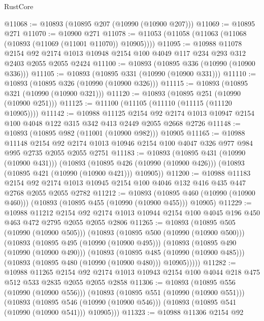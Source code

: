 \begin{lexlean}{RustCore}
\begin{coremodule}
@11068 := @10893 (@10895 @207 (@10990 (@10900 @207)))
@11069 := @10895 @271
@11070 := @10900 @271
@11078 := @11053 (@11058 (@11063 (@11068 (@10893 (@11069 (@11001 @11070)) @10905))))
@11095 := @10988
    @11078
    @2154
    @92
    @2174
    @1013
    @10948
    @2154
    @100
    @4049
    @117
    @234
    @293
    @312
    @2403
    @2055
    @2055
    @2424
@11100 := @10893 (@10895 @336 (@10990 (@10900 @336)))
@11105 := @10893 (@10895 @331 (@10990 (@10900 @331)))
@11110 := @10893 (@10895 @326 (@10990 (@10900 @326)))
@11115 := @10893 (@10895 @321 (@10990 (@10900 @321)))
@11120 := @10893 (@10895 @251 (@10990 (@10900 @251)))
@11125 := @11100 (@11105 (@11110 (@11115 (@11120 @10905))))
@11142 := @10988
    @11125
    @2154
    @92
    @2174
    @1013
    @10947
    @2154
    @100
    @4048
    @122
    @315
    @342
    @413
    @2449
    @2055
    @2668
    @2726
@11148 := @10893 (@10895 @982 (@11001 (@10900 @982))) @10905
@11165 := @10988
    @11148
    @2154
    @92
    @2174
    @1013
    @10946
    @2154
    @100
    @4047
    @326
    @977
    @984
    @995
    @2735
    @2055
    @2055
    @2751
@11183 := @10893
    (@10895 @431 (@10990 (@10900 @431)))
    (@10893
      (@10895 @426 (@10990 (@10900 @426)))
      (@10893 (@10895 @421 (@10990 (@10900 @421))) @10905))
@11200 := @10988
    @11183
    @2154
    @92
    @2174
    @1013
    @10945
    @2154
    @100
    @4046
    @132
    @416
    @435
    @447
    @2768
    @2055
    @2055
    @2782
@11212 := @10893
    (@10895 @460 (@10990 (@10900 @460)))
    (@10893 (@10895 @455 (@10990 (@10900 @455))) @10905)
@11229 := @10988
    @11212
    @2154
    @92
    @2174
    @1013
    @10944
    @2154
    @100
    @4045
    @196
    @450
    @463
    @472
    @2795
    @2055
    @2055
    @2806
@11265 := @10893
    (@10895 @505 (@10990 (@10900 @505)))
    (@10893
      (@10895 @500 (@10990 (@10900 @500)))
      (@10893
        (@10895 @495 (@10990 (@10900 @495)))
        (@10893
          (@10895 @490 (@10990 (@10900 @490)))
          (@10893
            (@10895 @485 (@10990 (@10900 @485)))
            (@10893 (@10895 @480 (@10990 (@10900 @480))) @10905)))))
@11282 := @10988
    @11265
    @2154
    @92
    @2174
    @1013
    @10943
    @2154
    @100
    @4044
    @218
    @475
    @512
    @533
    @2835
    @2055
    @2055
    @2858
@11306 := @10893
    (@10895 @556 (@10990 (@10900 @556)))
    (@10893
      (@10895 @551 (@10990 (@10900 @551)))
      (@10893
        (@10895 @546 (@10990 (@10900 @546)))
        (@10893 (@10895 @541 (@10990 (@10900 @541))) @10905)))
@11323 := @10988
    @11306
    @2154
    @92

\end{coremodule}
\end{lexlean}
